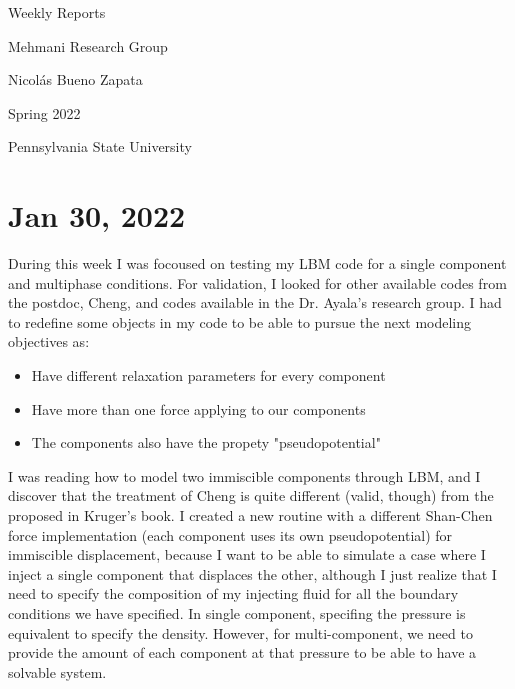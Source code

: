 \documentclass[12pt]{article}
\begin{document}
	\begin{titlepage}
		\begin{center}
			\vspace*{5cm}
			
			\Huge{Weekly Reports}
			
			\vspace{0.5cm}
			\LARGE{Mehmani Research Group}
			
			\vspace{3 cm}
			\Large{}
			
			\vspace{0.25cm}
			\large{Nicolás Bueno Zapata}
			
			\vspace{3 cm}
			\Large{Spring 2022}
			
			\vspace{0.25 cm}
			\Large{Pennsylvania State University}
			
			
			\vfill
		\end{center}
	\end{titlepage}
	
	\setcounter{page}{2}
	\pagestyle{fancy}
	\fancyhf{}
	\rhead{\thepage}
	
	\section*{Jan 30, 2022}
	 During this week I was focoused on testing my LBM code for a single component and multiphase conditions. For validation, I looked for other available codes from the postdoc, Cheng, and codes available in the Dr. Ayala's research group. I had to redefine some objects in my code to be able to pursue the next modeling objectives as:
		
	\begin{itemize}
		\item Have different relaxation parameters for every component
		\item Have more than one force applying to our components 
		\item The components also have the propety "pseudopotential"

	\end{itemize}

	I was reading how to model two immiscible components through LBM, and I discover that the treatment of Cheng is quite different (valid, though) from the proposed in Kruger's book. I created a new routine with a different Shan-Chen force implementation (each component uses its own pseudopotential) for immiscible displacement, because I want to be able to simulate a case where I inject a single component that displaces the other, although I just realize that I need to specify the composition of my injecting fluid for all the boundary conditions we have specified. In single component, specifing the pressure is equivalent to specify the density. However, for multi-component, we need to provide the amount of each component at that pressure to be able to have a solvable system.
	
\end{document}
